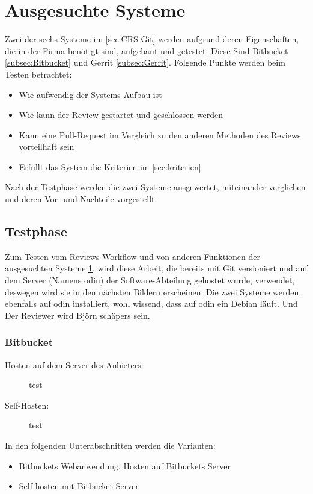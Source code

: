 \section{Ausgesuchte Systeme}
\label{sec:Ausgesuchte Systeme}

Zwei der sechs Systeme im \cref{sec:CRS-Git} werden aufgrund deren Eigenschaften, die in der Firma benötigt sind, aufgebaut und getestet. Diese Sind Bitbucket \cref{subsec:Bitbucket} und Gerrit \cref{subsec:Gerrit}.
Folgende Punkte werden beim Testen betrachtet:
\begin{itemize}
	\item Wie aufwendig der Systems Aufbau ist
	\item Wie kann der Review gestartet und geschlossen werden
	\item Kann eine Pull-Request im Vergleich zu den anderen Methoden des Reviews vorteilhaft sein
	\item Erfüllt das System die Kriterien im \cref{sec:kriterien}
\end{itemize}

Nach der Testphase werden die zwei Systeme ausgewertet, miteinander verglichen und deren Vor- und Nachteile vorgestellt.

\subsection{Testphase}
\label{subsec:testphase}

Zum Testen vom Reviews Workflow und von anderen Funktionen der ausgesuchten Systeme \cref{sec:Ausgesuchte Systeme}, wird diese Arbeit, die bereits mit Git versioniert und auf dem Server (Namens odin) der Software-Abteilung gehostet wurde, verwendet, deswegen wird sie in den nächsten Bildern erscheinen.  Die zwei Systeme werden ebenfalls auf odin installiert, wohl wissend, dass auf odin ein Debian läuft. Und Der Reviewer wird Björn schäpers \cite{Bjoern} sein.

\subsubsection{Bitbucket}
\label{subsubsec:Test_Bitbucket}

\begin{description}
	\item [Hosten auf dem Server des Anbieters:]
	test
	
	
	\item [Self-Hosten:]
	test
\end{description}
In den folgenden Unterabschnitten werden die Varianten:
\begin{itemize}
	\item Bitbuckets Webanwendung. Hosten auf Bitbuckets Server
	\item Self-hosten mit Bitbucket-Server
\end{itemize}

